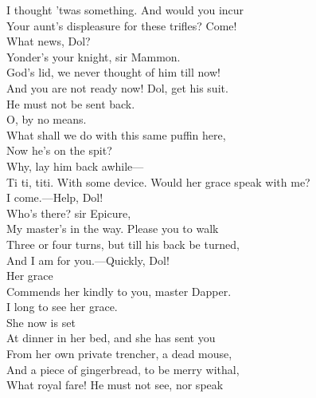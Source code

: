\documentclass[a4paper,oneside,12pt]{memoir}
\begin{document}
\begin{drama*}
\facespeaks I thought 'twas something. And would you incur\\
Your aunt's displeasure for these trifles? Come!\\
\subtlespeaks What news, Dol?\\
\dolspeaks {} Yonder's your knight, sir Mammon.\\
\facespeaks God's lid, we never thought of him till now!\\
\subtlespeaks And you are not ready now! Dol, get his suit.\\
He must not be sent back.\\
\facespeaks {} O, by no means.\\
What shall we do with this same puffin here,\\
Now he's on the spit?\\
\subtlespeaks {} Why, lay him back
awhile---\\
\dolspeaks Ti ti, titi.
\subtlespeaks With some device. Would her grace speak with me?\\
I come.---Help, Dol!\\
\facespeaks {}  Who's there? sir Epicure,\\
My master's in the way. Please you to walk\\
Three or four turns, but till his back be turned,\\
And I am for you.---Quickly, Dol!\\
\subtlespeaks {} Her grace\\
Commends her kindly to you, master Dapper.\\
\dapperspeaks I long to see her grace.\\
\subtlespeaks {} She now is set\\
At dinner in her bed, and she has sent you\\
From her own private trencher, a dead mouse,\\
And a piece of gingerbread, to be merry withal,\\
\facespeaks What royal fare!
\subtlespeaks {} He must not see, nor speak\\

\end{drama*}
\end{document}
